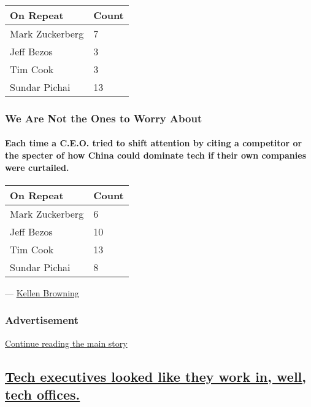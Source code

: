 \begin{longtable}[]{@{}ll@{}}
\toprule
\textbf{On Repeat} & \textbf{Count}\tabularnewline
\midrule
\endhead
Mark Zuckerberg & 7\tabularnewline
Jeff Bezos & 3\tabularnewline
Tim Cook & 3\tabularnewline
Sundar Pichai & 13\tabularnewline
\bottomrule
\end{longtable}

\hypertarget{we-are-not-the-ones-to-worry-about}{%
\subsubsection{We Are Not the Ones to Worry
About}\label{we-are-not-the-ones-to-worry-about}}

\hypertarget{each-time-a-ceo-tried-to-shift-attention-by-citing-a-competitor-or-the-specter-of-how-china-could-dominate-tech-if-their-own-companies-were-curtailed}{%
\paragraph{Each time a C.E.O. tried to shift attention by citing a
competitor or the specter of how China could dominate tech if their own
companies were
curtailed.}\label{each-time-a-ceo-tried-to-shift-attention-by-citing-a-competitor-or-the-specter-of-how-china-could-dominate-tech-if-their-own-companies-were-curtailed}}

\begin{longtable}[]{@{}ll@{}}
\toprule
\textbf{On Repeat} & \textbf{Count}\tabularnewline
\midrule
\endhead
Mark Zuckerberg & 6\tabularnewline
Jeff Bezos & 10\tabularnewline
Tim Cook & 13\tabularnewline
Sundar Pichai & 8\tabularnewline
\bottomrule
\end{longtable}

--- \href{https://www.nytimes.com/by/kellen-browning}{Kellen Browning}

\hypertarget{advertisement-2}{%
\subsubsection{Advertisement}\label{advertisement-2}}

\protect\hyperlink{after-dfp-ad-mid3}{Continue reading the main story}

\hypertarget{tech-executives-looked-like-they-work-in-well-tech-offices}{%
\subsection{\texorpdfstring{\protect\hyperlink{tech-executives-looked-like-they-work-in-well-tech-offices}{Tech
executives looked like they work in, well, tech
offices.}}{Tech executives looked like they work in, well, tech offices.}}\label{tech-executives-looked-like-they-work-in-well-tech-offices}}

